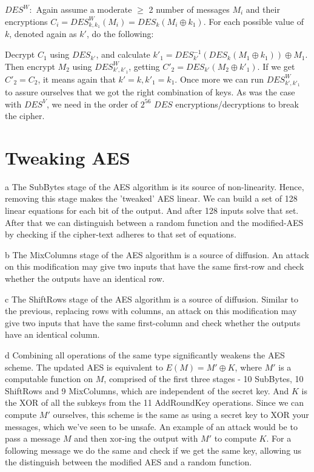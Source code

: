 \documentclass{article}
\begin{document}
\begin{paragraph}
    {$DES^{W}:$} Again assume a moderate $\geq$ 2 number of messages $M_i$ and their encryptions $C_{i} = DES^{W}_{k, k_1}(M_i) = DES_{k}(M_i \oplus k_1)$. For each possible value of $k$, denoted again as $k'$, do the following:
    
    Decrypt $C_1$ using $DES_{k'}$, and calculate $k'_1 = DES^{-1}_{k'}(DES_k(M_1 \oplus k_1)) \oplus M_1$. Then encrypt $M_2$ using $DES^W_{k', k'_1}$, getting $C'_2 = DES_{k'}(M_2 \oplus k'_1)$. If we get $C'_2 = C_2$, it means again that $k' = k, k'_1 = k_1$. Once more we can run $DES^W_{k', k'_1}$ to assure ourselves that we got the right combination of keys. As was the case with $DES^V$, we need in the order of $2^{56}$ $DES$ encryptions/decryptions to break the cipher.
\end{paragraph}

\section{Tweaking AES}
\begin{paragraph}
	a The SubBytes stage of the AES algorithm is its source of non-linearity.
	Hence, removing this stage makes the 'tweaked' AES linear.
	We can build a set of 128 linear equations for each bit of the output. And after 128 inputs
	solve that set. After that we can distinguish between a random function and the modified-AES
	by checking if the cipher-text adheres to that set of equations.
\end{paragraph}

\begin{paragraph}
	b The MixColumns stage of the AES algorithm is a source of diffusion.
	An attack on this modification may give two inputs that have the same first-row and
	check whether the outputs have an identical row.
\end{paragraph}

\begin{paragraph}
	c The ShiftRows stage of the AES algorithm is a source of diffusion.
	Similar to the previous, replacing rows with columns, an attack on this modification
	 may give two inputs that have the same first-column and check whether the outputs
	 have an identical column.
\end{paragraph}

\begin{paragraph}
	d Combining all operations of the same type significantly weakens the AES scheme.
	The updated AES is equivalent to ${E(M) = M'\oplus K}$, where $M'$ is a computable function
	on $M$, comprised of the first three stages - 10 SubBytes, 10 ShiftRows and 9 MixColumns, which
	are independent of the secret key. And $K$ is the XOR of all the subkeys
	from the 11 AddRoundKey operations. Since we can compute $M'$ ourselves, this scheme is 
	the same as using a secret key to XOR your messages, which we've seen to be unsafe.
	An example of an attack would be to pass a message $M$ and then xor-ing the output with
	$M'$ to compute $K$. For a following message we do the same and check if we get the 
	same key, allowing us the distinguish between the modified AES and a random function.

\end{paragraph}
\end{document}
